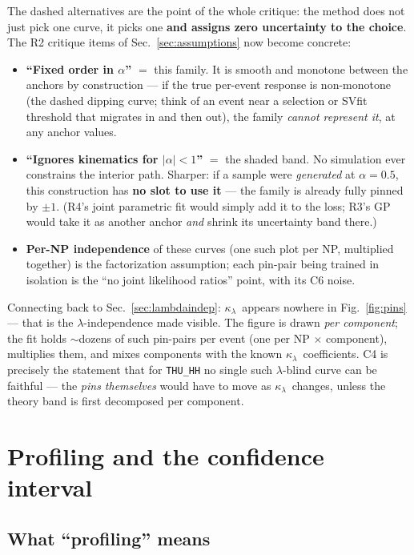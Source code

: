 \documentclass[11pt]{article}
\newcommand{\kl}{\ensuremath{\kappa_\lambda}}
\begin{document}
\noindent The dashed alternatives are the point of the whole critique: the method does not just pick one curve,
it picks one \textbf{and assigns zero uncertainty to the choice}. The R2 critique items of
Sec.~\ref{sec:assumptions} now become concrete:
\begin{itemize}
\item \textbf{``Fixed order in $\alpha$''} $=$ this family. It is smooth and monotone between the anchors by
  construction --- if the true per-event response is non-monotone (the dashed dipping curve; think of an event
  near a selection or SVfit threshold that migrates in and then out), the family \emph{cannot represent it}, at
  any anchor values.
\item \textbf{``Ignores kinematics for $|\alpha|<1$''} $=$ the shaded band. No simulation ever constrains the
  interior path. Sharper: if a sample were \emph{generated} at $\alpha=0.5$, this construction has \textbf{no
  slot to use it} --- the family is already fully pinned by $\pm1$. (R4's joint parametric fit would simply add
  it to the loss; R3's GP would take it as another anchor \emph{and} shrink its uncertainty band there.)
\item \textbf{Per-NP independence} of these curves (one such plot per NP, multiplied together) is the
  factorization assumption; each pin-pair being trained in isolation is the ``no joint likelihood ratios''
  point, with its C6 noise.
\end{itemize}
Connecting back to Sec.~\ref{sec:lambdaindep}: \kl\ appears nowhere in Fig.~\ref{fig:pins} --- that is the
$\lambda$-independence made visible. The figure is drawn \emph{per component}; the fit holds $\sim$dozens of
such pin-pairs per event (one per NP $\times$ component), multiplies them, and mixes components with the known
\kl\ coefficients. C4 is precisely the statement that for \texttt{THU\_HH} no single such $\lambda$-blind curve
can be faithful --- the \emph{pins themselves} would have to move as \kl\ changes, unless the theory band is
first decomposed per component.

\section{Profiling and the confidence interval}\label{sec:profiling}

\subsection{What ``profiling'' means}\label{sec:profdef}
\end{document}
